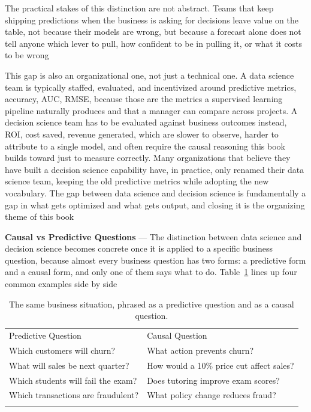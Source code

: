 The practical stakes of this distinction are not abstract. Teams that keep
shipping predictions when the business is asking for decisions leave value on
the table, not because their models are wrong, but because a forecast alone does
not tell anyone which lever to pull, how confident to be in pulling it, or what
it costs to be wrong

This gap is also an organizational one, not just a technical one. A data science
team is typically staffed, evaluated, and incentivized around predictive metrics,
accuracy, AUC, RMSE, because those are the metrics a supervised learning pipeline
naturally produces and that a manager can compare across projects. A decision
science team has to be evaluated against business outcomes instead, ROI, cost
saved, revenue generated, which are slower to observe, harder to attribute to a single
model, and often require the causal reasoning this book builds toward just to
measure correctly. Many organizations that believe they have built a decision science
capability have, in practice, only renamed their data science team, keeping the
old predictive metrics while adopting the new vocabulary. The gap between data science
and decision science is fundamentally a gap in what gets optimized and what gets
output, and closing it is the organizing theme of this book

\textbf{Causal vs Predictive Questions} --- The distinction between data science
and decision science becomes concrete once it is applied to a specific business
question, because almost every business question has two forms: a predictive
form and a causal form, and only one of them says what to do. Table~\ref{tab:predictive-vs-causal-questions}
lines up four common examples side by side

\begin{table}[!t]
  \caption{The same business situation, phrased as a predictive question and as a
  causal question.}
  \label{tab:predictive-vs-causal-questions}
  \begin{tabular}{p{5.7cm}p{5.7cm}}
    \hline
    \noalign{\smallskip} Predictive Question                                     & Causal Question                          \\
    \noalign{\smallskip}\svhline\noalign{\smallskip} Which customers will churn? & What action prevents churn?              \\
    What will sales be next quarter?                                             & How would a 10\% price cut affect sales? \\
    Which students will fail the exam?                                           & Does tutoring improve exam scores?       \\
    Which transactions are fraudulent?                                           & What policy change reduces fraud?        \\
    \noalign{\smallskip}                                                          \hline
    \noalign{\smallskip}
  \end{tabular}
\end{table}

